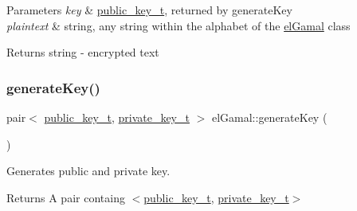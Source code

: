 \begin{DoxyParams}{Parameters}
{\em key} & \mbox{\hyperlink{structelGamal_1_1public__key__t}{public\+\_\+key\+\_\+t}}, returned by generate\+Key \\
\hline
{\em plaintext} & string, any string within the alphabet of the \mbox{\hyperlink{namespaceelGamal}{el\+Gamal}} class\\
\hline
\end{DoxyParams}
\begin{DoxyReturn}{Returns}
string -\/ encrypted text 
\end{DoxyReturn}
\mbox{\label{namespaceelGamal_a146d7e0430b165ea18111d6342b7888b}} 
\subsubsection{\texorpdfstring{generate\+Key()}{generateKey()}}
{\footnotesize\ttfamily pair$<$ \mbox{\hyperlink{structelGamal_1_1public__key__t}{public\+\_\+key\+\_\+t}}, \mbox{\hyperlink{structelGamal_1_1private__key__t}{private\+\_\+key\+\_\+t}} $>$ el\+Gamal\+::generate\+Key (\begin{DoxyParamCaption}{ }\end{DoxyParamCaption})}



Generates public and private key. 

\begin{DoxyReturn}{Returns}
A pair containg $<$\mbox{\hyperlink{structelGamal_1_1public__key__t}{public\+\_\+key\+\_\+t}}, \mbox{\hyperlink{structelGamal_1_1private__key__t}{private\+\_\+key\+\_\+t}}$>$ 
\end{DoxyReturn}

